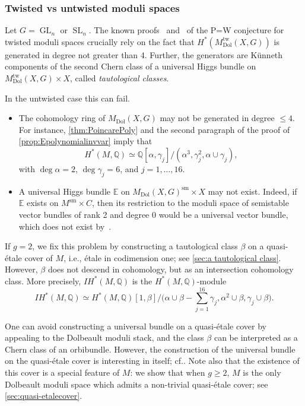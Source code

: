 \documentclass[11pt]{article}
\newcommand{\ie}{i.e.,\xspace}
\newcommand{\cf}{cf.\xspace}
\let\ts\textstyle
\newcommand{\IH}{\mathit{IH}}
\theoremstyle{definition}
\newcommand{\QQ}{\mathbb{Q}}
\newcommand{\Gl}{\operatorname{GL}}
\newcommand{\Sl}{\operatorname{SL}}
\newcommand{\mdoltwisted}{M_{\mathrm{Dol}}^{\mathrm{tw}}(X,G)}
\newcommand{\MDolG}{{M}_{\mathrm{Dol}}(X,G)}
\begin{document}
\subsubsection*{Twisted vs untwisted moduli spaces} Let $G=\Gl_n$ or $\Sl_n$. The known proofs~\cite{deCataldoHauselMigliorini2012} and~\cite{deCataldoMaulikShen2019} of the P=W conjecture for twisted moduli spaces crucially rely on the fact that $H^*(\mdoltwisted)$ is generated in degree not greater than 4. Further, the generators are Künneth components of the second Chern class of a universal Higgs bundle on $\mdoltwisted \times X$, called \emph{tautological classes}.

In the untwisted case this can fail.
\begin{itemize}
\item The cohomology ring of $\MDolG$ may not be generated in degree $\leq 4$. For instance, \cref{thm:PoincarePoly} and the second paragraph of the proof of \cref{prop:Epolynomialinvvar} imply that\vspace*{-3pt}\enlargethispage{.5\baselineskip}%
\[
H^*(M, \QQ) \simeq \QQ[\alpha, \gamma_j]/(\alpha^3, \gamma_j^2, \alpha\cup \gamma_j),
\]
with $\deg \alpha =2$, $\deg \gamma_j = 6$, and $j=1, \ldots, 16$.
\item A universal Higgs bundle $\mathbb{E}$ on $\MDolG^{\mathrm{sm}}\!\times\! X$ may not exist. Indeed, if~$\mathbb{E}$ exists on $M^{\mathrm{sm}}\!\times\! C$, then its restriction to the moduli space of semistable vector bundles of rank 2 and degree 0 would be a universal vector bundle, which does not exist by~\cite{NR69}.
\end{itemize}

If $g=2$, we fix this problem by constructing a tautological class $\beta$ on a quasi-étale cover of $M$, \ie étale in codimension one; see \cref{sec:a tautological class}. However, $\beta$ does not descend in cohomology, but as an intersection cohomology class. More precisely, $\IH^*(M, \QQ)$ is the $H^*(M,\QQ)$-module\vspace*{-3pt}
\[
\IH^*(M, \QQ) \simeq H^*(M,\QQ) [ 1, \beta ]/\bigl(\alpha \cup \beta - \ts\sum^{16}_{j=1}\gamma_j, \alpha^2 \cup \beta, \gamma_j \cup \beta \bigr).
\]

One can avoid constructing a universal bundle on a quasi-étale cover by appealing to the Dolbeault moduli stack, and the class $\beta$ can be interpreted as a Chern class of an orbibundle. However, the construction of the universal bundle on the quasi-étale cover is interesting in itself; \cf \cite[\S 6.1]{HeuLoray19}. Note also that the existence of this cover is a special feature of $M$: we show that when $g \geq 2$, $M$ is the only Dolbeault moduli space which admits a non-trivial quasi-étale cover; see \cref{sec:quasi-etalecover}.
\end{document}
